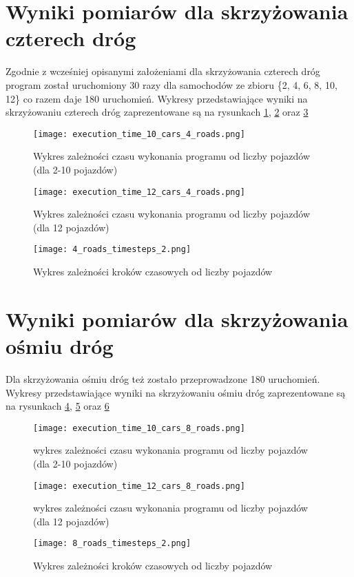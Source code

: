 \section{Wyniki pomiarów dla skrzyżowania czterech dróg}

Zgodnie z wcześniej opisanymi założeniami dla skrzyżowania czterech dróg program został uruchomiony 30 razy dla samochodów ze zbioru \{2, 4, 6, 8, 10, 12\} co razem daje 180 uruchomień.
\newline
\newline
Wykresy przedstawiające wyniki na skrzyżowaniu czterech dróg zaprezentowane są na rysunkach \ref{execution_time_10_cars_4_roads}, \ref{execution_time_12_cars_4_roads} oraz \ref{four-roads-crossroads-timesteps}
\begin{figure}[H]
  \centering
  \texttt{[image: execution\_time\_10\_cars\_4\_roads.png]}
  \caption{Wykres zależności czasu wykonania programu od liczby pojazdów (dla 2-10 pojazdów)}
  \label{execution_time_10_cars_4_roads}
\end{figure}
\begin{figure}[H]
  \centering
  \texttt{[image: execution\_time\_12\_cars\_4\_roads.png]}
  \caption{Wykres zależności czasu wykonania programu od liczby pojazdów (dla 12 pojazdów)}
  \label{execution_time_12_cars_4_roads}
\end{figure}
\begin{figure}[H]
  \centering
  \texttt{[image: 4\_roads\_timesteps\_2.png]}
  \caption{Wykres zależności kroków czasowych od liczby pojazdów}
  \label{four-roads-crossroads-timesteps}
\end{figure}

\section{Wyniki pomiarów dla skrzyżowania ośmiu dróg}

Dla skrzyżowania ośmiu dróg też zostało przeprowadzone 180 uruchomień.
\newline
\newline
Wykresy przedstawiające wyniki na skrzyżowaniu ośmiu dróg zaprezentowane są na rysunkach \ref{execution_time_10_cars_8_roads}, \ref{execution_time_12_cars_8_roads} oraz \ref{eight-roads-crossroads-timesteps}
\begin{figure}[H]
  \centering
  \texttt{[image: execution\_time\_10\_cars\_8\_roads.png]}
  \caption{wykres zależności czasu wykonania programu od liczby pojazdów (dla 2-10 pojazdów)}
  \label{execution_time_10_cars_8_roads}
\end{figure}
\begin{figure}[H]
  \centering
  \texttt{[image: execution\_time\_12\_cars\_8\_roads.png]}
  \caption{wykres zależności czasu wykonania programu od liczby pojazdów (dla 12 pojazdów)}
  \label{execution_time_12_cars_8_roads}
\end{figure}
\begin{figure}[H]
  \centering
  \texttt{[image: 8\_roads\_timesteps\_2.png]}
  \caption{Wykres zależności kroków czasowych od liczby pojazdów}
  \label{eight-roads-crossroads-timesteps}
\end{figure}

